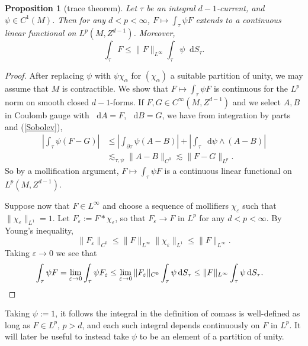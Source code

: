 \documentclass[reqno,11pt]{amsart}
\newcommand*\dif{\mathop{}\!\mathrm{d}}
\newtheorem{proposition}[theorem]{Proposition}
\theoremstyle{definition}
\numberwithin{equation}{section}
\begin{document}
\begin{proposition}[trace theorem]\label{integration is welldefined}
Let $\tau$ be an integral $d-1$-current, and $\psi \in C^1(M)$.
Then for any $d < p < \infty$, $F \mapsto \int_\tau \psi F$ extends to a continuous linear functional on $L^p(M, Z^{d - 1})$.
Moreover,
\begin{equation}\label{integral over chain is linfinity}
	\int_\tau F \leq \|F\|_{L^\infty} \int_\tau \psi \dif S_\tau.
\end{equation}
\end{proposition}
\begin{proof}
After replacing $\psi$ with $\psi \chi_\alpha$ for $(\chi_\alpha)$ a suitable partition of unity, we may assume that $M$ is contractible.
We show that $F \mapsto \int_\tau \psi F$ is continuous for the $L^p$ norm on smooth closed $d-1$-forms.
If $F, G \in C^\infty(M, Z^{d - 1})$ and we select $A, B$ in Coulomb gauge with $\dif A = F$, $\dif B = G$, we have from integration by parts and (\ref{Sobolev}),
\begin{align*}
	\left|\int_\tau \psi(F - G)\right| 
	&\leq \left|\int_{\partial \tau} \psi (A - B)\right| + \left|\int_\tau \dif \psi \wedge (A - B)\right| \\
	&\lesssim_{\tau, \psi} \|A - B\|_{C^0} \lesssim \|F - G\|_{L^p}.
\end{align*}
So by a mollification argument, $F \mapsto \int_\tau \psi F$ is a continuous linear functional on $L^p(M, Z^{d - 1})$.

Suppose now that $F \in L^\infty$ and choose a sequence of mollifiers $\chi_\varepsilon$ such that $\|\chi_\varepsilon\|_{L^1} = 1$.
Let $F_\varepsilon := F * \chi_\varepsilon$, so that $F_\varepsilon \to F$ in $L^p$ for any $d < p < \infty$.
By Young's inequality, 
$$\|F_\varepsilon\|_{C^0} \leq \|F\|_{L^\infty} \|\chi_\varepsilon\|_{L^1} \leq \|F\|_{L^\infty}.$$
Taking $\varepsilon \to 0$ we see that
\begin{align*}
\int_\tau \psi F 
&= \lim_{\varepsilon \to 0} \int_\tau \psi F_\varepsilon \leq \lim_{\varepsilon \to 0} \|F_\varepsilon\|_{C^0} \int_\tau \psi \dif S_\tau \leq \|F\|_{L^\infty} \int_\tau \psi \dif S_\tau. \qedhere
\end{align*}
\end{proof}

Taking $\psi := 1$, it follows the integral in the definition of comass is well-defined as long as $F \in L^p$, $p > d$, and each such integral depends continuously on $F$ in $L^p$.
It will later be useful to instead take $\psi$ to be an element of a partition of unity.
\end{document}
